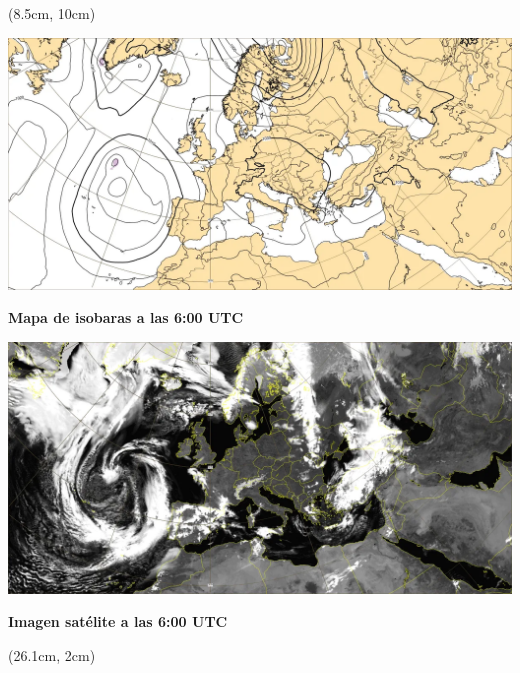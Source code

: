 \documentclass[a4paper,landscape,final,8pt]{beamer} %
\begin{document}
\begin{textblock*}{21cm}(8.5cm, 10cm)

  \begin{minipage}{0.48\textwidth}
      \centering
      \includegraphics[width=\linewidth]{../Output/img_mapa_1.png}
      \par\vspace{2mm}
      \textbf{Mapa de isobaras a las 6:00 UTC}
  \end{minipage}
  \hfill
  \begin{minipage}{0.48\textwidth}
      \centering
      \includegraphics[width=\linewidth]{../Output/img_mapa_2.png}
      \par\vspace{2mm}
      \textbf{Imagen satélite a las 6:00 UTC}
  \end{minipage}

\end{textblock*}

\begin{textblock*}{3.9cm}(26.1cm, 2cm) 

  
  \end{textblock*}
  
\end{document}
